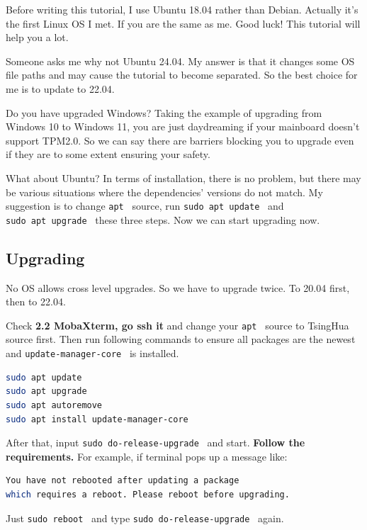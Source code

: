 \documentclass[lang=en,color=blue,12pt]{elegantbook}
\let\oldtexttt\texttt
\renewcommand{\texttt}[1]{%
  \begingroup
  \setlength{\fboxsep}{1pt}%
  \colorbox{gray!10}{\oldtexttt{#1}}%
  \endgroup
}
\begin{document}
Before writing this tutorial, I use Ubuntu 18.04 rather than Debian.
Actually it's the first Linux OS I met. If you are the
same as me. Good luck! This tutorial will help you a lot.

Someone asks me why not Ubuntu 24.04. My answer is that it changes some
OS file paths and may cause the tutorial to become separated. So the
best choice for me is to update to 22.04.

Do you have upgraded Windows? Taking the example of upgrading from
Windows 10 to Windows 11, you are just daydreaming if your mainboard
doesn't support TPM2.0. So we can say there are barriers
blocking you to upgrade even if they are to some extent ensuring your
safety.

What about Ubuntu? In terms of installation, there is no problem, but
there may be various situations where the dependencies'
versions do not match. My suggestion is to change \texttt{apt}\ source,
run \texttt{sudo\ apt\ update}\ and \texttt{sudo\ apt\ upgrade}\ these
three steps. Now we can start upgrading now.

\subsection{Upgrading}

No OS allows cross level upgrades. So we have to upgrade twice. To 20.04
first, then to 22.04.

Check \textbf{2.2 MobaXterm, go ssh it} and change your \texttt{apt}\
source to TsingHua source first. Then run following commands to ensure
all packages are the newest and \texttt{update-manager-core}\ is
installed.

\begin{lstlisting}[language=bash]
sudo apt update
sudo apt upgrade
sudo apt autoremove
sudo apt install update-manager-core
\end{lstlisting}

After that, input \texttt{sudo\ do-release-upgrade}\ and start.
\textbf{Follow the requirements.} For example, if terminal pops up a
message like:

\begin{lstlisting}[language=bash]
You have not rebooted after updating a package
which requires a reboot. Please reboot before upgrading.
\end{lstlisting}

Just \texttt{sudo\ reboot}\ and type \texttt{sudo\ do-release-upgrade}\
again.
\end{document}
